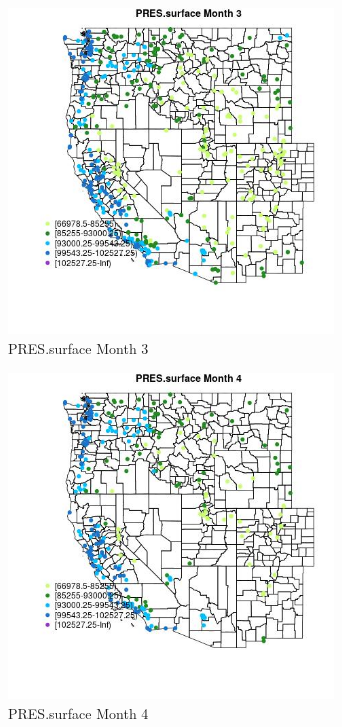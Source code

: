 \begin{figure} 
\centering  
\includegraphics[width=0.77\textwidth]{Code_Outputs/Report_ML_input_PM25_Step4_part_e_de_duplicated_aveswNAs_MapObsMo3PRESsurface.jpg} 
\caption{\label{fig:Report_ML_input_PM25_Step4_part_e_de_duplicated_aveswNAsMapObsMo3PRESsurface}PRES.surface Month 3} 
\end{figure} 
 

\begin{figure} 
\centering  
\includegraphics[width=0.77\textwidth]{Code_Outputs/Report_ML_input_PM25_Step4_part_e_de_duplicated_aveswNAs_MapObsMo4PRESsurface.jpg} 
\caption{\label{fig:Report_ML_input_PM25_Step4_part_e_de_duplicated_aveswNAsMapObsMo4PRESsurface}PRES.surface Month 4} 
\end{figure} 
 

